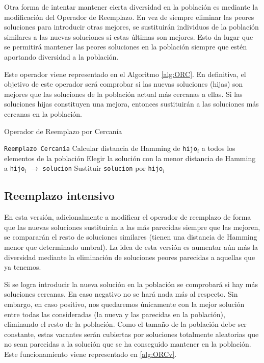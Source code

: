 Otra forma de intentar mantener cierta diversidad en la población es mediante la modificación del Operador de Reemplazo. 
En vez de siempre eliminar las peores soluciones para introducir otras mejores, se sustituirán individuos de la población similares a las nuevas soluciones si estas últimas son mejores. 
Esto da lugar que se permitirá mantener las peores soluciones en la población siempre que estén aportando diversidad a la población.

Este operador \parencite{mahfoudCrowdingPreselectionRevisited1992} viene representado en el Algoritmo \ref{alg:ORC}. 
En definitiva, el objetivo de este operador será comprobar si las nuevas soluciones (hijas) son mejores que las soluciones de la población actual más cercanas a ellas. 
Si las soluciones hijas constituyen una mejora, entonces sustituirán a las soluciones más cercanas en la población. 

\begin{algorithm}
\caption{Operador de Reemplazo por Cercanía}\label{alg:ORC}
\begin{algorithmic}[1]
\Procedure \texttt{Reemplazo Cercanía}
	\State Calcular distancia de Hamming de \texttt{hijo$_i$} a todos los elementos de la población
	\State Elegir la solución con la menor distancia de Hamming a \texttt{hijo$_i$} $\xrightarrow{}{}$ \texttt{solucion}
		\State Sustituir \texttt{solucion} por \texttt{hijo$_i$}
	\EndIf
\EndFor
\EndProcedure
\end{algorithmic}
\end{algorithm}

\subsection{Reemplazo intensivo}

En esta versión, adicionalmente a modificar el operador de reemplazo de forma que las nuevas soluciones sustituirán a las más parecidas siempre que las mejoren, se compararán el resto de soluciones similares (tienen una distancia de Hamming menor que determinado umbral). 
La idea de esta versión es aumentar aún más la diversidad mediante la eliminación de soluciones peores parecidas a aquellas que ya tenemos. 

Si se logra introducir la nueva solución en la población se comprobará si hay más soluciones cercanas. 
En caso negativo no se hará nada más al respecto. 
Sin embargo, en caso positivo, nos quedaremos únicamente con la mejor solución entre todas las consideradas (la nueva y las parecidas en la población), eliminando el resto de la población. 
Como el tamaño de la población debe ser constante, estas vacantes serán cubiertas por soluciones totalmente aleatorias que no sean parecidas a la solución que se ha conseguido mantener en la población. 
Este funcionamiento viene representado en \ref{alg:ORCv}.

